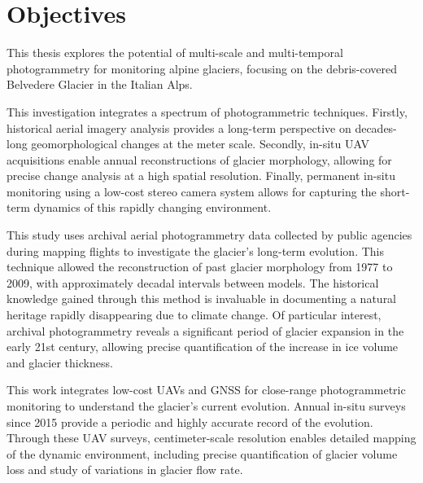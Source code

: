 


\section{Objectives}

This thesis explores the potential of multi-scale and multi-temporal photogrammetry 
for monitoring alpine glaciers, focusing on the debris-covered Belvedere Glacier in the Italian Alps.

This investigation integrates a spectrum of photogrammetric techniques.  
Firstly, historical aerial imagery analysis provides a long-term perspective on decades-long geomorphological changes at the meter scale.  
Secondly, in-situ UAV acquisitions enable annual reconstructions of glacier morphology, allowing for precise change analysis at a high spatial resolution.  
Finally, permanent in-situ monitoring using a low-cost stereo camera system allows for capturing the short-term dynamics of this rapidly changing environment.


This study uses archival aerial photogrammetry data collected by public agencies during mapping flights to investigate the glacier's long-term evolution.
This technique allowed the reconstruction of past glacier morphology from 1977 to 2009, with approximately decadal intervals between models.  
The historical knowledge gained through this method is invaluable in documenting a natural heritage rapidly disappearing due to climate change. 
Of particular interest, archival photogrammetry reveals a significant period of glacier expansion in the early 21st century, allowing precise quantification of the increase in ice volume and glacier thickness.

This work integrates low-cost UAVs and GNSS for close-range photogrammetric monitoring to understand the glacier's current evolution.
Annual in-situ surveys since 2015 provide a periodic and highly accurate record of the evolution. 
Through these UAV surveys, centimeter-scale resolution enables detailed mapping of the dynamic environment, including precise quantification of glacier volume loss and study of variations in glacier flow rate.

